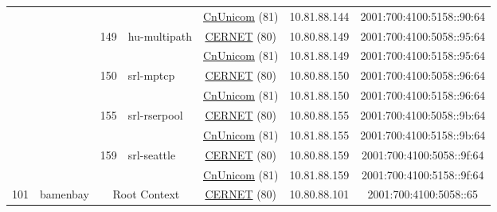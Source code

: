 \begin{small}
\begin{center}
\begin{longtable}{|c|c|c|c|c|c|c|c|}
  &  &  &  & \multicolumn{2}{|c|}{\tiny{\href{http://www.chinaunicom.com}{CnUnicom} (81)}} & \tiny{10.81.88.144} & \tiny{2001:700:4100:5158::90:64} \\* \cline{3-3}\cline{4-4}\cline{5-5}\cline{6-6}\cline{7-7}\cline{8-8}
  &  & \multirow{2}{*}{\tiny{149}} & \multicolumn{1}{|l|}{\multirow{2}{*}{\tiny{hu-multipath}}} & \multicolumn{2}{|c|}{\tiny{\href{http://www.cernet.edu.cn}{CERNET} (80)}} & \tiny{10.80.88.149} & \tiny{2001:700:4100:5058::95:64} \\* \cline{5-5}\cline{6-6}\cline{7-7}\cline{8-8}
  &  &  &  & \multicolumn{2}{|c|}{\tiny{\href{http://www.chinaunicom.com}{CnUnicom} (81)}} & \tiny{10.81.88.149} & \tiny{2001:700:4100:5158::95:64} \\* \cline{3-3}\cline{4-4}\cline{5-5}\cline{6-6}\cline{7-7}\cline{8-8}
  &  & \multirow{2}{*}{\tiny{150}} & \multicolumn{1}{|l|}{\multirow{2}{*}{\tiny{srl-mptcp}}} & \multicolumn{2}{|c|}{\tiny{\href{http://www.cernet.edu.cn}{CERNET} (80)}} & \tiny{10.80.88.150} & \tiny{2001:700:4100:5058::96:64} \\* \cline{5-5}\cline{6-6}\cline{7-7}\cline{8-8}
  &  &  &  & \multicolumn{2}{|c|}{\tiny{\href{http://www.chinaunicom.com}{CnUnicom} (81)}} & \tiny{10.81.88.150} & \tiny{2001:700:4100:5158::96:64} \\* \cline{3-3}\cline{4-4}\cline{5-5}\cline{6-6}\cline{7-7}\cline{8-8}
  &  & \multirow{2}{*}{\tiny{155}} & \multicolumn{1}{|l|}{\multirow{2}{*}{\tiny{srl-rserpool}}} & \multicolumn{2}{|c|}{\tiny{\href{http://www.cernet.edu.cn}{CERNET} (80)}} & \tiny{10.80.88.155} & \tiny{2001:700:4100:5058::9b:64} \\* \cline{5-5}\cline{6-6}\cline{7-7}\cline{8-8}
  &  &  &  & \multicolumn{2}{|c|}{\tiny{\href{http://www.chinaunicom.com}{CnUnicom} (81)}} & \tiny{10.81.88.155} & \tiny{2001:700:4100:5158::9b:64} \\* \cline{3-3}\cline{4-4}\cline{5-5}\cline{6-6}\cline{7-7}\cline{8-8}
  &  & \multirow{2}{*}{\tiny{159}} & \multicolumn{1}{|l|}{\multirow{2}{*}{\tiny{srl-seattle}}} & \multicolumn{2}{|c|}{\tiny{\href{http://www.cernet.edu.cn}{CERNET} (80)}} & \tiny{10.80.88.159} & \tiny{2001:700:4100:5058::9f:64} \\* \cline{5-5}\cline{6-6}\cline{7-7}\cline{8-8}
  &  &  &  & \multicolumn{2}{|c|}{\tiny{\href{http://www.chinaunicom.com}{CnUnicom} (81)}} & \tiny{10.81.88.159} & \tiny{2001:700:4100:5158::9f:64} \\ \hline
 \multirow{18}{*}{\tiny{101}} & \multicolumn{1}{|l|}{\multirow{18}{*}{\tiny{bamenbay}}} & \multicolumn{2}{|c|}{\multirow{2}{*}{\tiny{Root Context}}} & \multicolumn{2}{|c|}{\tiny{\href{http://www.cernet.edu.cn}{CERNET} (80)}} & \tiny{10.80.88.101} & \tiny{2001:700:4100:5058::65} \\* \cline{5-5}\cline{6-6}\cline{7-7}\cline{8-8}

\end{longtable}
\end{center}
\end{small}
